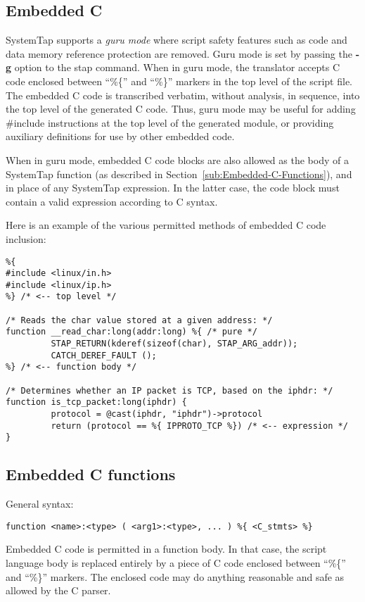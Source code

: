 \documentclass[twoside,english]{article}
\newenvironment{vindent}
{\begin{list}{}{\setlength{\listparindent}{6pt}}
\item[]}
{\end{list}}
\begin{document}
\subsection{Embedded C\label{sub:Embedded-C}}
SystemTap supports a \emph{guru mode} where script
safety features such as code and data memory reference protection are
removed. Guru mode is set by passing the \textbf{-g} option to the
stap command. When in guru mode, the translator accepts C code
enclosed between {}``\%\{'' and {}``\%\}'' markers in the top level of
the script file. The embedded C code is transcribed verbatim, without
analysis, in sequence, into the top level of the generated C
code. Thus, guru mode may be useful for adding \#include instructions
at the top level of the generated module, or providing auxiliary
definitions for use by other embedded code.

When in guru mode, embedded C code blocks are also allowed as the body
of a SystemTap function (as described in
Section~\ref{sub:Embedded-C-Functions}), and in place of any SystemTap
expression. In the latter case, the code block must contain a valid
expression according to C syntax.

Here is an example of the various permitted methods of embedded C code inclusion:

\begin{vindent}
\begin{verbatim}
%{
#include <linux/in.h>
#include <linux/ip.h>
%} /* <-- top level */

/* Reads the char value stored at a given address: */ 
function __read_char:long(addr:long) %{ /* pure */
         STAP_RETURN(kderef(sizeof(char), STAP_ARG_addr));
         CATCH_DEREF_FAULT ();
%} /* <-- function body */

/* Determines whether an IP packet is TCP, based on the iphdr: */
function is_tcp_packet:long(iphdr) {
         protocol = @cast(iphdr, "iphdr")->protocol
         return (protocol == %{ IPPROTO_TCP %}) /* <-- expression */
}
\end{verbatim}
\end{vindent}

\subsection{Embedded C functions\label{sub:Embedded-C-Functions}}

General syntax:

\begin{vindent}
\begin{verbatim}
function <name>:<type> ( <arg1>:<type>, ... ) %{ <C_stmts> %}
\end{verbatim}
\end{vindent}
Embedded C code is permitted in a function body.
In that case, the script language
body is replaced entirely by a piece of C code enclosed between 
{}``\%\{'' and {}``\%\}'' markers.
The enclosed code may do anything reasonable and safe as allowed
by the C parser.
\end{document}
